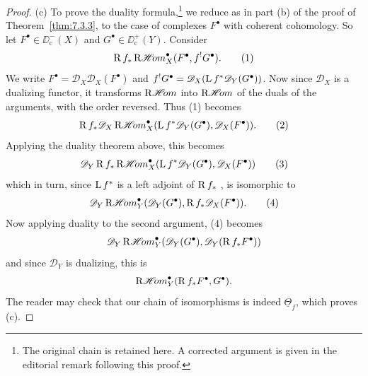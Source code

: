 \begin{proof}
\medskip\noindent(c) To prove the duality formula,\footnote{The original chain is retained here. A corrected argument is given in the editorial remark following this proof.} we reduce as in part (b) of the proof of Theorem~\ref{thm:7.3.3}, to the case of complexes $F^{\bullet}$ with coherent cohomology. So let $F^{\bullet} \in \DD_{\mathrm{c}}^{-}(X)$ and $G^{\bullet} \in \DD_{\mathrm{c}}^{+}(Y)$. Consider
\[
\operatorname{R} f_{*} \mathop{\mathrm{R}\mathscr{H}\!om}\nolimits_{X}^{\bullet}(F^{\bullet}, f^{!}G^{\bullet}). \tag{1}
\]
We write $F^{\bullet} = \mathscr{D}_{X} \mathscr{D}_{X}(F^{\bullet})$ and $f^{!}G^{\bullet} = \mathscr{D}_{X}(\operatorname{L} f^{*} \mathscr{D}_{Y}(G^{\bullet}))$. Now since $\mathscr{D}_{X}$ is a dualizing functor, it transforms $\mathop{\mathrm{R}\mathscr{H}\!om}\nolimits$ into $\mathop{\mathrm{R}\mathscr{H}\!om}\nolimits$ of the duals of the arguments, with the order reversed. Thus (1) becomes
\[
\operatorname{R} f_{*} \mathscr{D}_{X} \mathop{\mathrm{R}\mathscr{H}\!om}\nolimits_{X}^{\bullet}(\operatorname{L} f^{*} \mathscr{D}_{Y}(G^{\bullet}), \mathscr{D}_{X}(F^{\bullet})). \tag{2}
\]
Applying the duality theorem above, this becomes
\[
\mathscr{D}_{Y} \operatorname{R} f_{*} \mathop{\mathrm{R}\mathscr{H}\!om}\nolimits_{X}^{\bullet}(\operatorname{L} f^{*} \mathscr{D}_{Y}(G^{\bullet}), \mathscr{D}_{X}(F^{\bullet})) \tag{3}
\]
which in turn, since $\operatorname{L} f^{*}$ is a left adjoint of $\operatorname{R} f_{*}$ , is isomorphic to
\[
\mathscr{D}_{Y} \mathop{\mathrm{R}\mathscr{H}\!om}\nolimits_{Y}^{\bullet}(\mathscr{D}_{Y}(G^{\bullet}), \operatorname{R} f_{*} \mathscr{D}_{X}(F^{\bullet})). \tag{4}
\]
Now applying duality to the second argument, (4) becomes
\[
\mathscr{D}_{Y} \mathop{\mathrm{R}\mathscr{H}\!om}\nolimits_{Y}^{\bullet}(\mathscr{D}_{Y}(G^{\bullet}), \mathscr{D}_{Y}(\operatorname{R} f_{*}F^{\bullet}))
\]
and since $\mathscr{D}_{Y}$ is dualizing, this is
\[
\mathop{\mathrm{R}\mathscr{H}\!om}\nolimits_{Y}^{\bullet}(\operatorname{R} f_{*}F^{\bullet}, G^{\bullet}).
\]
The reader may check that our chain of isomorphisms is indeed $\underline{\Theta}_{f}$, which proves (c).
\end{proof}

